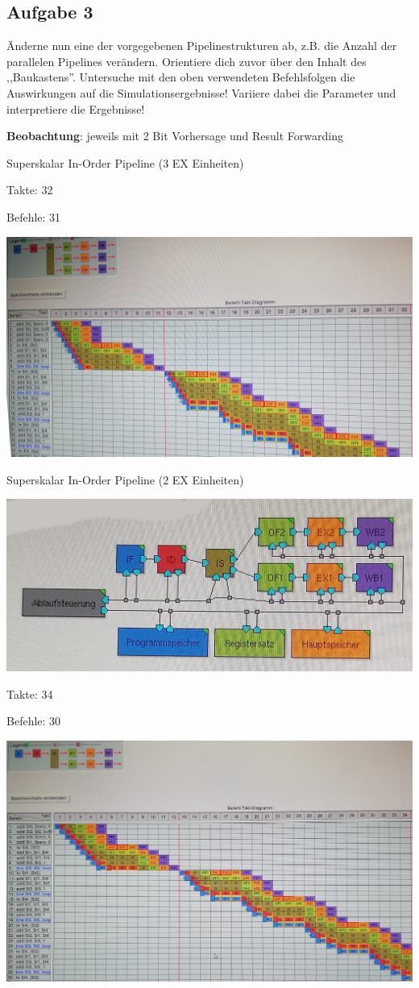 \documentclass[a4paper,12pt,titlepage]{scrartcl}
\begin{document}
\newpage
\subsection*{Aufgabe 3}
Änderne nun eine der vorgegebenen Pipelinestrukturen ab, z.B. die Anzahl der parallelen Pipelines verändern. Orientiere dich zuvor über den Inhalt des ,,Baukastens''. Untersuche mit den oben verwendeten Befehlsfolgen die Auswirkungen auf die Simulationsergebnisse! Variiere dabei die Parameter und interpretiere die Ergebnisse!

\textbf{Beobachtung}: jeweils mit 2 Bit Vorhersage und Result Forwarding
\begin{itemize*}
    \item Superskalar In-Order Pipeline (3 EX Einheiten)
    \begin{itemize*}
        \item Takte: 32
        \item Befehle: 31
        \item \includegraphics[width=.4\linewidth]{Assets/RA2-65225.jpg}
    \end{itemize*}
    \item Superskalar In-Order Pipeline (2 EX Einheiten)
    \begin{itemize*}
        \item \includegraphics[width=.4\linewidth]{Assets/RA2-65346.jpg}
        \item Takte: 34
        \item Befehle: 30
        \item \includegraphics[width=.4\linewidth]{Assets/RA2-65517.jpg}

\end{itemize*}
\end{itemize*}
\end{document}
